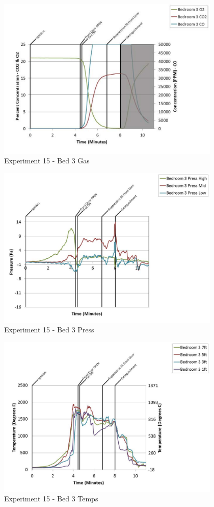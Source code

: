 \documentclass{article}
\begin{document}
\begin{appendices}
	\clearpage

	\begin{figure}[h!]
		\centering
		\includegraphics[height=3.05in]{0_Images/Results_Charts/Exp_15_Charts/Bed3Gas.pdf}
		\caption{Experiment 15 - Bed 3 Gas}
	\end{figure}
 

	\begin{figure}[h!]
		\centering
		\includegraphics[height=3.05in]{0_Images/Results_Charts/Exp_15_Charts/Bed3Press.pdf}
		\caption{Experiment 15 - Bed 3 Press}
	\end{figure}
 
	\clearpage

	\begin{figure}[h!]
		\centering
		\includegraphics[height=3.05in]{0_Images/Results_Charts/Exp_15_Charts/Bed3Temps.pdf}
		\caption{Experiment 15 - Bed 3 Temps}
	\end{figure}
 


\end{appendices}
\end{document}
